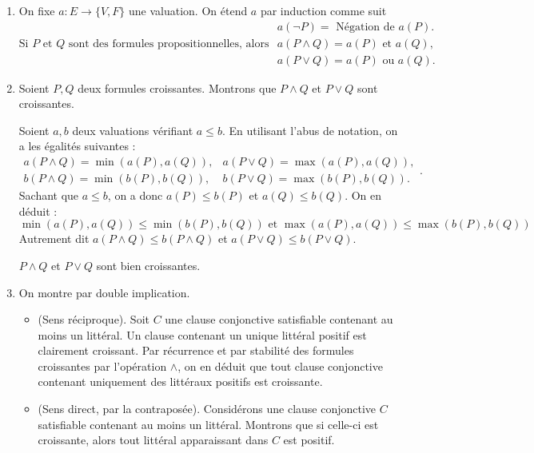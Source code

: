 \documentclass[a4paper, 11pt]{article}
\begin{document}
 \begin{enumerate}
     \item On fixe $a:E\to \{V,F\}$ une valuation. On étend $a$ par induction comme suit
         $$\mbox{Si $P$ et $Q$ sont des formules propositionnelles, alors } 
         \begin{array}{l}
         a(\neg P)= \mbox{ Négation de } a(P) . \\
         a(P \wedge Q)= a(P) \mbox{ et } a(Q), \\ 
         a(P \vee Q) = a(P) \mbox{ ou } a(Q).
     \end{array}$$ 

         

    \item  Soient $P,Q$ deux formules croissantes. Montrons que $P\wedge Q$ et  $P\vee Q$ sont croissantes.


        Soient $a,b$ deux valuations vérifiant $a\leq b$. En utilisant l'abus de notation, 
        on a les égalités suivantes :
        \[
            \begin{array}{ll}
                a(P\wedge Q)=\min(a(P),a(Q)), &a(P\vee Q)=\max(a(P),a(Q)), \\ 
                b(P\wedge Q)=\min(b(P),b(Q)), &b(P\vee Q)=\max(b(P),b(Q)).
            \end{array}
        .\] 
                 Sachant que $a\leq b$, on a donc $a(P)\leq b(P)$ et $a(Q)\leq b(Q)$. On en déduit :
        $$ \min(a(P),a(Q))\leq \min(b(P),b(Q)) \mbox{ et } \max(a(P),a(Q))\leq \max (b(P),b(Q)) $$
        Autrement dit  $a(P\wedge Q)\leq b(P\wedge Q)$ et $a(P\vee Q) \leq b(P\vee Q)$.

         $P\wedge Q$ et  $P\vee Q$ sont bien croissantes.

            \item On montre par double implication.
                \begin{itemize}
                    \item (Sens réciproque). Soit $C$ une clause conjonctive satisfiable contenant au moins un littéral. 
Un clause contenant un unique littéral positif est clairement croissant. Par récurrence et par stabilité des formules croissantes par l'opération $\wedge$, on en déduit que tout clause conjonctive contenant uniquement
des littéraux positifs est croissante. 
\item (Sens direct, par la contraposée). Considérons une clause conjonctive $C$ satisfiable contenant au moins un littéral. Montrons que si celle-ci
est croissante, alors tout littéral apparaissant dans $C$ est positif.



\end{itemize}
\end{enumerate}
\end{document}
